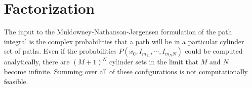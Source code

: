 \documentclass[aps,prc,reprint,noshowpacs,groupedaddress,onecolumn]{revtex4}
\def\beq{\begin{equation}}
\def\eeq{\end{equation}}
\begin{document}

  
\section{Factorization}

The input to the Muldowney-Nathanson-J{\o}rgensen formulation of the
path integral is the complex probabilities that a path will be in a
particular cylinder set of paths.  Even if the probabilities
$P(x_0,I_{m_11}, \cdots ,I_{m_NN})$ could be computed analytically,
there are $(M+1)^{N}$ cylinder sets in the limit that $M$ and $N$
become infinite.  Summing over all of these configurations is not
computationally feasible.
\end{document}
